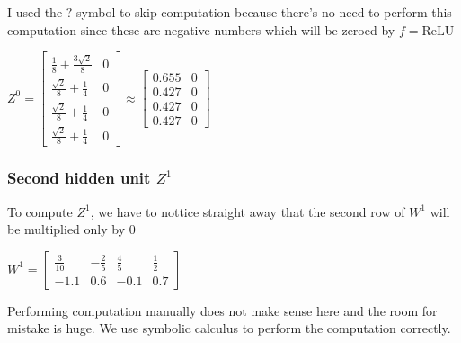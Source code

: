 \documentclass[a4paper]{article}
\begin{document}
I used the $?$ symbol to skip computation because there's no need to perform this computation since these are negative numbers
which will be zeroed by $f=\text{ReLU}$


$Z^{0} = \left[\begin{matrix}\frac{1}{8} + \frac{3 \sqrt{2}}{8} & 0\\\frac{\sqrt{2}}{8} + \frac{1}{4} & 0\\\frac{\sqrt{2}}{8} + \frac{1}{4} & 0\\\frac{\sqrt{2}}{8} + \frac{1}{4} & 0\end{matrix}\right]
\approx \begin{bmatrix}
    0.655 &  0\\
    0.427 &  0\\
    0.427 &  0\\
    0.427 &  0
  \end{bmatrix}
$

\subsubsection*{Second hidden unit $Z^{1}$}
To compute $Z^{1}$, we have to nottice straight away that the second row of $W^{1}$ will be multiplied only by $0$

$W^{1} = \left[\begin{matrix}\frac{3}{10} & - \frac{2}{5} & \frac{4}{5} & \frac{1}{2}\\-1.1 & 0.6 & -0.1 & 0.7\end{matrix}\right]$

Performing computation manually does not make sense here and the room for mistake is huge.
We use symbolic calculus to perform the computation correctly.
\end{document}
